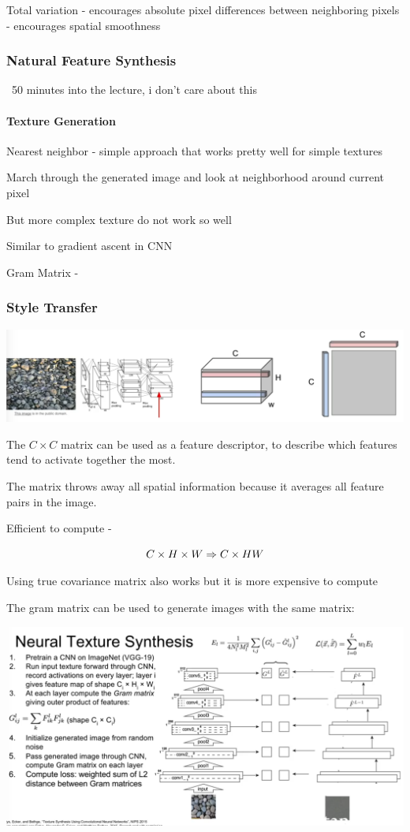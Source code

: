 Total variation - encourages absolute pixel differences between neighboring pixels - encourages spatial smoothness

\subsubsection{Natural Feature Synthesis}

~50 minutes into the lecture, i don't care about this

\paragraph{Texture Generation}

Nearest neighbor - simple approach that works pretty well for simple textures

March through the generated image and look at neighborhood around current pixel

But more complex texture do not work so well

Similar to gradient ascent in CNN

Gram Matrix -  

\subsubsection{Style Transfer}

\includegraphics[width=0.5\columnwidth]{fei_fei_li/lecture_12/text_synthesis.png}

The $C\times C$ matrix can be used as a feature descriptor, to describe which features tend to activate together the most.

The matrix throws away all spatial information because it averages all feature pairs in the image. 

Efficient to compute - 

$$ C \times H \times W \Rightarrow C \times HW \\$$ 

Using true covariance matrix also works but it is more expensive to compute

The gram matrix can be used to generate images with the same matrix:

\includegraphics[width=0.5\columnwidth]{fei_fei_li/lecture_12/texture_synthesis.png}

